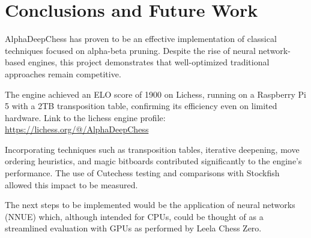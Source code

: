 \chapter{Conclusions and Future Work}
\label{cap:conclusiones}

AlphaDeepChess has proven to be an effective implementation of classical techniques focused on alpha-beta pruning. Despite the rise of neural network-based engines, this project demonstrates that well-optimized traditional approaches remain competitive.

\vspace{1em}

\noindent The engine achieved an ELO score of 1900 on Lichess, running on a Raspberry Pi 5 with a 2TB transposition table, confirming its efficiency even on limited hardware.
Link to the lichess engine profile: \url{https://lichess.org/@/AlphaDeepChess}

\vspace{1em}

\noindent Incorporating techniques such as transposition tables, iterative deepening, move ordering heuristics, and magic bitboards contributed significantly to the engine's performance. The use of Cutechess testing and comparisons with Stockfish allowed this impact to be measured.

\vspace{1em}

\noindent The next steps to be implemented would be the application of neural networks (NNUE) which, although intended for CPUs, could be thought of as a streamlined evaluation with GPUs as performed by Leela Chess Zero.
